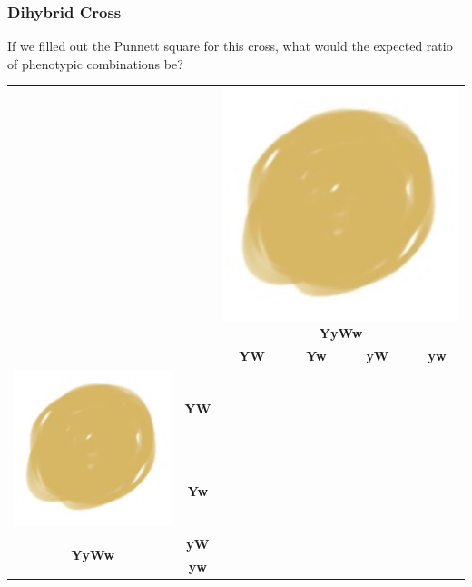 \documentclass{beamer}
\begin{document}
\begin{frame}
	\frametitle{Dihybrid Cross}
If we filled out the Punnett square for this cross, what would the expected ratio of phenotypic combinations be?\\
 
 \bigskip

\begin{tabular}{c|c|c|c|c|c|}
	\multicolumn{2}{c|}{} & \multicolumn{4}{c}{	\includegraphics[width=0.1\linewidth]{img/yellowSmooth} \textcolor[HTML]{E1BE6A}{\textbf{YyWw}}} \\
		\cline{3-6} 
	\multicolumn{2}{c|}{} & \textcolor[HTML]{E1BE6A}{\textbf{YW}} &  \textcolor[HTML]{E1BE6A}{\textbf{Yw}}&  \textcolor[HTML]{E1BE6A}{\textbf{yW}} &  \textcolor[HTML]{E1BE6A}{\textbf{yw}}\\
	\hline 
	\multirow{2}{*}{\includegraphics[width=0.1\linewidth]{img/yellowSmooth} }	& \textcolor[HTML]{40B0A6}{\textbf{YW}}& &  & &\\		
	\cline{2-6} 
	&	\textcolor[HTML]{40B0A6}{\textbf{Yw}} & &  & &\\
		\cline{2-6} 
		\multirow{2}{*}{\textcolor[HTML]{40B0A6}{\textbf{YyWw}}}&	\textcolor[HTML]{40B0A6}{\textbf{yW}} & &  & &\\
		\cline{2-6} 
	&	\textbf{\textcolor[HTML]{40B0A6}{\textbf{yw}}} & &  & & \\
		\cline{1-6} 
\end{tabular}

	
\end{frame}
	
\end{document}
